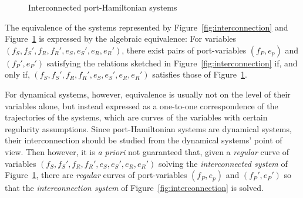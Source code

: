 \documentclass[preprint,12pt]{elsarticle}
\theoremstyle{definition}
\begin{document}
\begin{figure}[!ht]
\centering
{}
\caption{Interconnected port-Hamiltonian systems}
\label{fig:interconnected_pH}
\end{figure}
The equivalence of the systems represented by Figure~\ref{fig:interconnection} and Figure~\ref{fig:interconnected_pH} is expressed by the algebraic equivalence: For variables $(f_S,f_S',f_R,f_R',e_S,e_S',e_R,e_R')$, there exist pairs of port-variables $(f_P,e_p)$ and $(f_P',e_P')$ satisfying the relations sketched in Figure~\ref{fig:interconnection} if, and only if, $(f_S,f_S',f_R,f_R',e_S,e_S',e_R,e_R')$ satisfies those of Figure~\ref{fig:interconnected_pH}.

For dynamical systems, however, equivalence is usually not on the level of their variables alone, but instead expressed as a one-to-one correspondence of the trajectories of the systems, which are curves of the variables with certain regularity assumptions. Since port-Hamiltonian systems are dynamical systems, their interconnection should be studied from the dynamical systems' point of view. Then however, it is \textit{a priori} not guaranteed that, given a \textit{regular} curve of variables $(f_S,f_S',f_R,f_R',e_S,e_S',e_R,e_R')$ solving the \textit{interconnected system} of Figure~\ref{fig:interconnected_pH}, there are \textit{regular} curves of port-variables $(f_P,e_p)$ and $(f_P',e_P')$ so that the \textit{interconnection system} of Figure~\ref{fig:interconnection} is solved.
\end{document}
